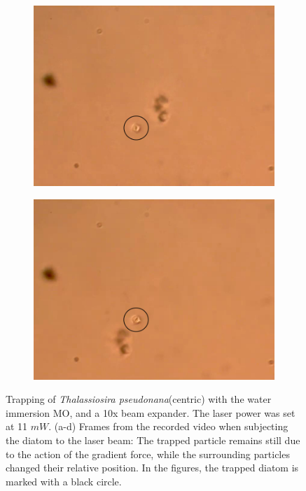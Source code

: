 \documentclass[letterpaper,12pt,oneside]{book}
\begin{document}
\begin{figure}[H]
\begin{subfigure}[b]{0.5\linewidth}
    \caption{}
    \label{fig7:b} 
    \vspace{4ex}
  \end{subfigure} 
  \begin{subfigure}[b]{0.5\linewidth}
    \centering
    \includegraphics[scale=0.28]{Results/Pseudonana water/wpseudonana3.png} 
    \caption{}
    \label{fig7:c} 
  \end{subfigure}%
  \begin{subfigure}[b]{0.5\linewidth}
    \centering
    \includegraphics[scale=0.28]{Results/Pseudonana water/wpseudonana4.png} 
    \caption{}
    \label{fig7:d} 
  \end{subfigure} 
  \caption{Trapping of \textit{Thalassiosira pseudonana}(centric) with the water immersion MO, and a 10x beam expander. The laser power was set at 11 $mW$. (a-d) Frames from
the recorded video when subjecting the diatom to the laser beam: The trapped particle remains still due to the action of the gradient force, while the surrounding particles changed their relative position. In the figures, the trapped diatom is
marked with a black circle.}
  \label{} 
\end{figure}
\end{document}

